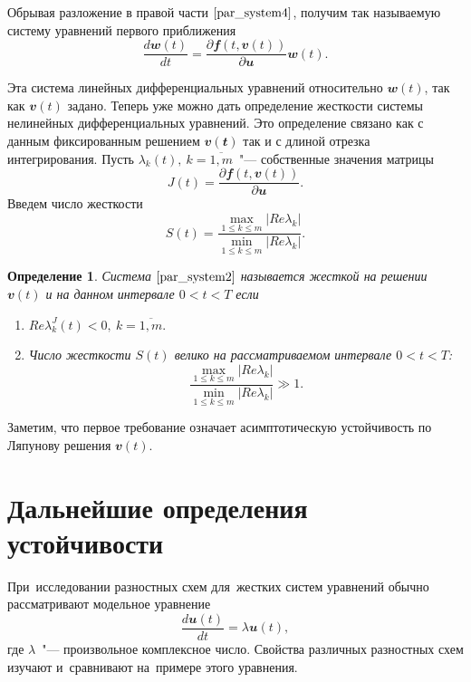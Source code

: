 \documentclass[11pt,a4paper,twoside,listtotoc,bibtotoc]{report}
\numberwithin{equation}{section}
\newtheorem*{definition}{Определение}
\theoremstyle{definition}
\theoremstyle{plain}
\newcommand{\vfunc}[1]{\mathbfit{#1}}
\begin{document}
Обрывая разложение в правой части $\eqref{par_system4}$, получим
так называемую систему уравнений первого приближения
%
\begin{equation}
%
    \label{par_system5}
    \dfrac{d\vfunc{w}(t)}{dt} = \dfrac{\partial
    \vfunc{f}(t,\vfunc{v}(t))}{\partial \vfunc{u}}\vfunc{w}(t).
%
\end{equation}
%

Эта система линейных дифференциальных уравнений относительно $\vfunc{w}(t)$,
так как $\vfunc{v}(t)$ задано. Теперь уже можно дать определение жесткости
системы нелинейных дифференциальных уравнений. Это определение связано как
с данным фиксированным решением $\vfunc{v(t)}$ так и с длиной отрезка
интегрирования. Пусть $\lambda_k(t),~k=\overline{1,m}$~"--- собственные
значения матрицы
%
$$
    J(t) = \dfrac{\partial \vfunc{f}(t,\vfunc{v}(t))}{\partial \vfunc{u}}.
$$
%
Введем число жесткости
%
$$
    S(t) = \dfrac{\max\limits_{1 \leqslant k \leqslant m}\left|Re\lambda_k\right|}
    {\min\limits_{1 \leqslant k \leqslant m}\left|Re\lambda_k\right|}.
$$
%
\begin{definition}
%
    Система $\eqref{par_system2}$ называется жесткой на решении $\vfunc{v}(t)$
    и на данном интервале $0<t<T$ если
    \begin{enumerate}
        \item
        $Re\lambda^J_k(t) < 0,~k=\overline{1,m}.$
        \item
        Число жесткости $S(t)$ велико на рассматриваемом интервале $0<t<T$:
        $$
            \dfrac{\max\limits_{1 \leqslant k \leqslant m}|Re\lambda_k|}
            {\min\limits_{1 \leqslant k \leqslant m}|Re\lambda_k|}\gg 1.
        $$
    \end{enumerate}
%
\end{definition}
%

Заметим, что первое требование означает асимптотическую устойчивость по
Ляпунову решения $\vfunc{v}(t)$.
%
\section{Дальнейшие определения устойчивости}
%
При~исследовании разностных схем для~жестких систем уравнений обычно
рассматривают модельное уравнение
%
\begin{equation}
    \label{model-eq}
    \dfrac{d\vfunc{u}(t)}{dt}=\lambda\vfunc{u}(t),
\end{equation}
%
где $\lambda$~"--- произвольное комплексное число. Свойства различных разностных
схем изучают и~сравнивают на~примере этого уравнения.
\end{document}
